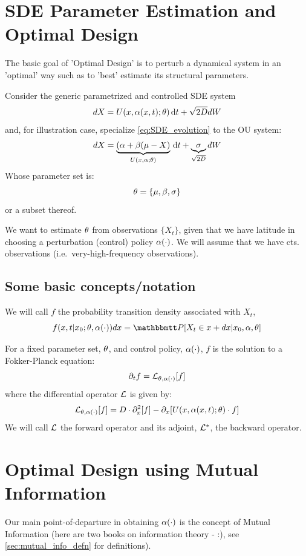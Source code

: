 \section{SDE Parameter Estimation and Optimal Design}
The basic goal of 'Optimal Design' is to perturb a dynamical system in an
'optimal' way such as to 'best' estimate its structural parameters.

Consider the generic parametrized and controlled SDE system 
\begin{equation}
dX = U(x,\alpha(x,t); { \theta}) \, \mathrm{d} t + \sqrt{2D} dW
\label{eq:SDE_evolution} 
\end{equation}
and, for illustration case, specialize \cref{eq:SDE_evolution} to the OU
system:
\begin{equation}
dX = \underbrace{(\alpha + \beta( \mu - X)}_{U(x,\alpha; { \theta})} \, \mathrm{d} t +
\underbrace{\sigma}_{\sqrt{2D}} dW
\label{eq:OU_evolution} 
\end{equation}
Whose parameter set is:
$$
{ \theta} = \{{\mu }, \beta, \sigma\}
$$
or a subset thereof.

We want to estimate ${ \theta}$  from observations $\{ X_t \}$, given that we have
latitude in choosing a perturbation (control) policy $\alpha(\cdot)$. We will assume
that we have cts. observations (i.e.\ very-high-frequency observations). 

\subsection{Some basic concepts/notation}
We will call $f$ the probability transition density associated with $X_t$, 
\begin{equation}
f(x,t| x_0 ;\th, \a(\cdot)) dx = \Prob[ X_t \in x + dx | x_0, \a, \th]
\end{equation} 

For a fixed parameter set, ${ \theta}$, and control policy, $\alpha(\cdot)$, $f$ is the
solution to a Fokker-Planck equation:
\begin{equation}
{\partial}_t f = { \mathcal{L} }_{{ \theta}, \alpha(\cdot)}[f]
\label{eq:fokker_planck_forward_density}
\end{equation}
where the differential operator ${ \mathcal{L} }$ is given by:
$$
{ \mathcal{L} }_{{ \theta}, \alpha(\cdot)}[f] = D \cdot {\partial}_x^2 [f] - {\partial}_x[U(x,\alpha(x,t); { \theta}) \cdot f]
$$
We will call ${ \mathcal{L} }$ the forward operator and its adjoint, ${ { \mathcal{L} }^* }$, the backward
operator.


\section{Optimal Design using Mutual Information}
Our main point-of-departure in obtaining $\alpha(\cdot)$ is the concept of Mutual
Information (here are two books on information theory -
\cite{Cover2006,MacKay2003} :), see \cref{sec:mutual_info_defn} for
definitions).


